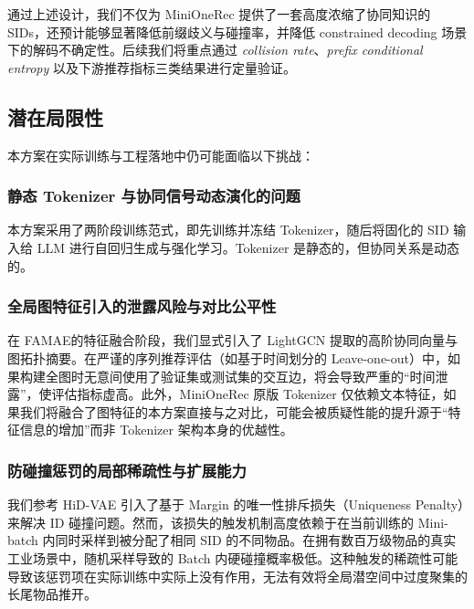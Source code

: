 \documentclass[11pt]{article}
\begin{document}
通过上述设计，我们不仅为 MiniOneRec 提供了一套高度浓缩了协同知识的 SIDs，还预计能够显著降低前缀歧义与碰撞率，并降低 constrained decoding 场景下的解码不确定性。后续我们将重点通过 \textit{collision rate}、\textit{prefix conditional entropy} 以及下游推荐指标三类结果进行定量验证。

\subsection{潜在局限性}

本方案在实际训练与工程落地中仍可能面临以下挑战：

\subsubsection{静态 Tokenizer 与协同信号动态演化的问题}
本方案采用了两阶段训练范式，即先训练并冻结 Tokenizer，随后将固化的 SID 输入给 LLM 进行自回归生成与强化学习。Tokenizer 是静态的，但协同关系是动态的。

\subsubsection{全局图特征引入的泄露风险与对比公平性}
在 FAMAE的特征融合阶段，我们显式引入了 LightGCN 提取的高阶协同向量与图拓扑摘要。在严谨的序列推荐评估（如基于时间划分的 Leave-one-out）中，如果构建全图时无意间使用了验证集或测试集的交互边，将会导致严重的“时间泄露”，使评估指标虚高。此外，MiniOneRec 原版 Tokenizer 仅依赖文本特征，如果我们将融合了图特征的本方案直接与之对比，可能会被质疑性能的提升源于“特征信息的增加”而非 Tokenizer 架构本身的优越性。

\subsubsection{防碰撞惩罚的局部稀疏性与扩展能力}
我们参考 HiD-VAE 引入了基于 Margin 的唯一性排斥损失（Uniqueness Penalty）来解决 ID 碰撞问题。然而，该损失的触发机制高度依赖于在当前训练的 Mini-batch 内同时采样到被分配了相同 SID 的不同物品。在拥有数百万级物品的真实工业场景中，随机采样导致的 Batch 内硬碰撞概率极低。这种触发的稀疏性可能导致该惩罚项在实际训练中实际上没有作用，无法有效将全局潜空间中过度聚集的长尾物品推开。

\clearpage
\end{document}
